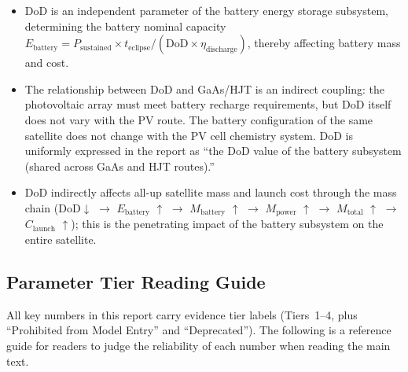 \begin{itemize}
  \item DoD is an independent parameter of the battery energy storage subsystem, determining the battery nominal capacity $E_{\text{battery}} = P_{\text{sustained}} \times t_{\text{eclipse}} / (\text{DoD} \times \eta_{\text{discharge}})$, thereby affecting battery mass and cost.
  \item The relationship between DoD and GaAs/HJT is an indirect coupling: the photovoltaic array must meet battery recharge requirements, but DoD itself does not vary with the PV route. The battery configuration of the same satellite does not change with the PV cell chemistry system. DoD is uniformly expressed in the report as ``the DoD value of the battery subsystem (shared across GaAs and HJT routes).''
  \item DoD indirectly affects all-up satellite mass and launch cost through the mass chain (DoD$\downarrow$ $\to$ $E_{\text{battery}}$ $\uparrow$ $\to$ $M_{\text{battery}}$ $\uparrow$ $\to$ $M_{\text{power}}$ $\uparrow$ $\to$ $M_{\text{total}}$ $\uparrow$ $\to$ $C_{\text{launch}}$ $\uparrow$); this is the penetrating impact of the battery subsystem on the entire satellite.
\end{itemize}

\subsection{Parameter Tier Reading Guide}
\label{sec:reading-guide}

All key numbers in this report carry evidence tier labels (Tiers~1--4, plus ``Prohibited from Model Entry'' and ``Deprecated''). The following is a reference guide for readers to judge the reliability of each number when reading the main text.

